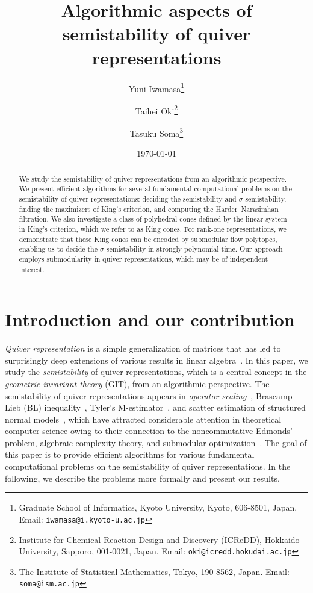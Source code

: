 \documentclass[a4paper,11pt]{article}
\title{Algorithmic aspects of semistability of quiver representations}
\author{Yuni Iwamasa\thanks{Graduate School of Informatics, Kyoto University, Kyoto, 606-8501, Japan. Email: \texttt{iwamasa@i.kyoto-u.ac.jp}}\and Taihei Oki\thanks{Institute for Chemical Reaction Design and Discovery (ICReDD), Hokkaido University, Sapporo, 001-0021, Japan. Email: \texttt{oki@icredd.hokudai.ac.jp}}\and Tasuku Soma\thanks{The Institute of Statistical Mathematics, Tokyo, 190-8562, Japan. Email: \texttt{soma@ism.ac.jp}}}
\date{\today}
\numberwithin{equation}{section}
\begin{document}
\maketitle

\begin{abstract}
We study the semistability of quiver representations from an algorithmic perspective.
We present efficient algorithms for several fundamental computational problems on the semistability of quiver representations: deciding the semistability and $\sigma$-semistability, finding the maximizers of King's criterion, and computing the Harder--Narasimhan filtration.
We also investigate a class of polyhedral cones defined by the linear system in King's criterion, which we refer to as King cones. 
For rank-one representations, we demonstrate that these King cones can be encoded by submodular flow polytopes, enabling us to decide the $\sigma$-semistability in strongly polynomial time.
Our approach employs submodularity in quiver representations, which may be of independent interest.
\end{abstract}
\allowdisplaybreaks

\section{Introduction and our contribution}\label{sec:introduction}


\emph{Quiver representation} is a simple generalization of matrices that has led to surprisingly deep extensions of various results in linear algebra~\citep{Derksen2017book}. 
In this paper, we study the \emph{semistability} of quiver representations, which is a central concept in the \emph{geometric invariant theory} (GIT), from an algorithmic perspective.
The semistability of quiver representations appears in \emph{operator scaling}~\citep{Gurvits2004,Garg2019,Franks2018,Burgisser2018a,Franks2023}, Brascamp--Lieb (BL) inequality~\citep{Garg2018}, Tyler's M-estimator~\citep{Franks2020}, and scatter estimation of structured normal models~\citep{Amendola2021}, which have attracted considerable attention in theoretical computer science owing to their connection to the noncommutative Edmonds' problem, algebraic complexity theory, and submodular optimization~\citep{Mulmuley2017,Ivanyos2018,Burgisser2019,Hamada2021}.
The goal of this paper is to provide efficient algorithms for various fundamental computational problems on the semistability of quiver representations.
In the following, we describe the problems more formally and present our results.
\end{document}
